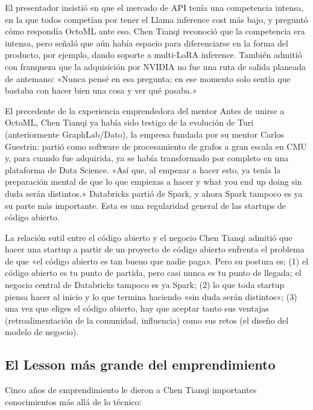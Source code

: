 El presentador insistió en que el mercado de API tenía una competencia intensa, en la que todos competían por tener el Llama inference cost más bajo, y preguntó cómo respondía OctoML ante eso. Chen Tianqi reconoció que la competencia era intensa, pero señaló que aún había espacio para diferenciarse en la forma del producto, por ejemplo, dando soporte a multi-LoRA inference. También admitió con franqueza que la adquisición por NVIDIA no fue una ruta de salida planeada de antemano: «Nunca pensé en esa pregunta; en ese momento solo sentía que bastaba con hacer bien una cosa y ver qué pasaba.»

\begin{knowledgebox}{El precedente de la experiencia emprendedora del mentor}
Antes de unirse a OctoML, Chen Tianqi ya había sido testigo de la evolución de Turi (anteriormente GraphLab/Dato), la empresa fundada por su mentor Carlos Guestrin: partió como software de procesamiento de grafos a gran escala en CMU y, para cuando fue adquirida, ya se había transformado por completo en una plataforma de Data Science. «Así que, al empezar a hacer esto, ya tenía la preparación mental de que lo que empiezas a hacer y what you end up doing sin duda serán distintos.» Databricks partió de Spark, y ahora Spark tampoco es ya su parte más importante. Esta es una regularidad general de las startups de código abierto.
\end{knowledgebox}

\begin{warningbox}{La relación sutil entre el código abierto y el negocio}
Chen Tianqi admitió que hacer una startup a partir de un proyecto de código abierto enfrenta el problema de que «el código abierto es tan bueno que nadie paga». Pero su postura es: (1) el código abierto es tu punto de partida, pero casi nunca es tu punto de llegada; el negocio central de Databricks tampoco es ya Spark; (2) lo que toda startup piensa hacer al inicio y lo que termina haciendo «sin duda serán distintos»; (3) una vez que eliges el código abierto, hay que aceptar tanto sus ventajas (retroalimentación de la comunidad, influencia) como sus retos (el diseño del modelo de negocio).
\end{warningbox}

\subsection{El Lesson más grande del emprendimiento}

Cinco años de emprendimiento le dieron a Chen Tianqi importantes conocimientos más allá de lo técnico:

